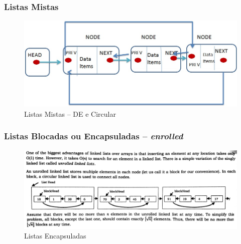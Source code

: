 
\begin{frame}%

\frametitle{Listas Mistas}

\begin{figure}[!hb]
	\centering
	\includegraphics[height=0.450\paperheight, width=0.8\paperwidth]{figs/fig_listas/lista_circular_DE.jpg}						
			\caption{Listas Mistas -- DE e Circular}	
		\end{figure} 

\end{frame} 

\begin{frame}%

\frametitle{Listas Blocadas ou Encapsuladas -- \textit{enrolled}}

\begin{figure}[!hb]
	\centering
	\includegraphics[height=0.60\paperheight, width=0.9\paperwidth]{figs/fig_listas/unrolled_listas.jpg}						
			\caption{Listas Encapsuladas}	
		\end{figure} 

\end{frame} 

